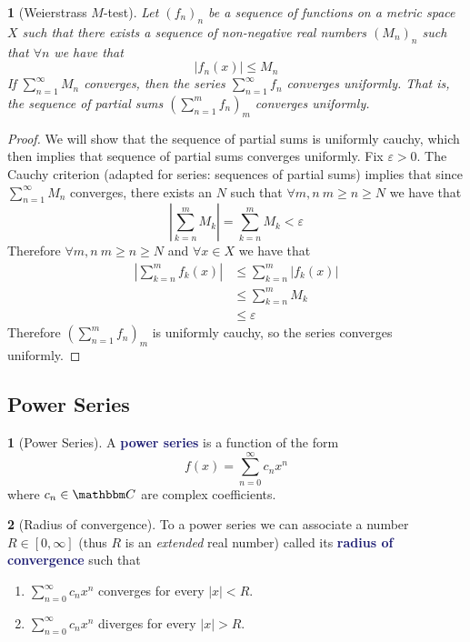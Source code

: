 \documentclass[12pt]{article}
\numberwithin{equation}{section}
\newcommand{\navy}[1]{\textcolor{MidnightBlue}{\bf #1}}
\theoremstyle{plain}
\newtheorem{theorem}{\color{ForestGreen}{\textbf{Theorem}}}[section]
\theoremstyle{definition}
\newtheorem{definition}{\color{MidnightBlue}{\textbf{Definition}}}[section]
\newcommand\abs[1]{\left| #1 \right|}
\newcommand{\1}{\mathbbm 1}
\newcommand{\e}{\varepsilon}
\newcommand{\CC}{\mathbbm C}
\begin{document}
\begin{theorem}[Weierstrass $M$-test]
	Let $(f_n)_n$ be a sequence of functions on a metric space $X$ such that there exists a sequence of non-negative real numbers $(M_n)_n$ such that $\forall n$ we have that
	\begin{equation}
		|f_n(x)| \leq M_n 
	\end{equation}
	If $\sum_{n=1}^\infty M_n$ converges, then the series $\sum_{n=1}^\infty f_n$ converges uniformly. That is, the sequence of partial sums $\left(\sum_{n=1}^m f_n\right)_m$ converges uniformly.  
\end{theorem}
\begin{proof}
	We will show that the sequence of partial sums is uniformly cauchy, which then implies that sequence of partial sums converges uniformly. Fix $\e > 0$. The Cauchy criterion (adapted for series: sequences of partial sums) implies that since $\sum_{n=1}^\infty M_n$ converges, there exists an $N$ such that $\forall m,n \ m\geq n\geq N$ we have that
	\begin{equation*}
		\abs{\sum_{k=n}^m M_k} = \sum_{k=n}^m M_k  < \e
	\end{equation*}
	Therefore $\forall m,n \ m\geq n\geq N$ and $\forall x \in X$ we have that
	\begin{align*}
		\abs{\sum_{k=n}^m f_k(x)} &\leq \sum_{k=n}^m \abs{f_k(x)} \tag{$\Delta$} \\
		&\leq \sum_{k=n}^m M_k \\
		&\leq \e
	\end{align*}
	Therefore $\left(\sum_{n=1}^m f_n\right)_m$ is uniformly cauchy, so the series converges uniformly. 
\end{proof}

\subsection{Power Series}

\begin{definition}[Power Series]
	A \navy{power series} is a function of the form
	\begin{equation}
		f(x) = \sum_{n=0}^\infty c_n x^n
	\end{equation}
	where $c_n \in \CC$ are complex coefficients. 
\end{definition}

\begin{definition}[Radius of convergence]
	To a power series we can associate a number $R \in [0, \infty]$ (thus $R$ is an \emph{extended} real number) called its \navy{radius of convergence} such that  
	\begin{enumerate}
		\item $\sum_{n=0}^\infty c_n x^n$ converges for every $|x| < R$.
		\item $\sum_{n=0}^\infty c_n x^n$ diverges for every $|x| > R$.
	\end{enumerate}
\end{definition}
\end{document}
